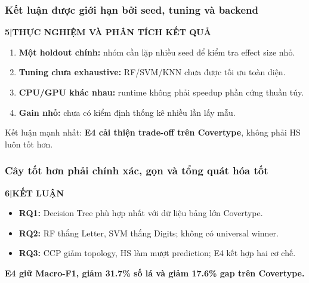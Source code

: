 \documentclass[aspectratio=169,12pt]{beamer}
\newcommand{\chaptertag}[2]{%
  \vspace{-0.16cm}%
  {\scriptsize\bfseries\textcolor{boxframe}{#1\enspace |\enspace #2}}\par
  \vspace{0.12cm}%
}
\begin{document}
\begin{frame}
  \frametitle{Kết luận được giới hạn bởi seed, tuning và backend}
  \chaptertag{5}{THỰC NGHIỆM VÀ PHÂN TÍCH KẾT QUẢ}
  \begin{enumerate}
    \item \textbf{Một holdout chính:} nhóm cần lặp nhiều seed để kiểm tra effect size nhỏ.
    \item \textbf{Tuning chưa exhaustive:} RF/SVM/KNN chưa được tối ưu toàn diện.
    \item \textbf{CPU/GPU khác nhau:} runtime không phải speedup phần cứng thuần túy.
    \item \textbf{Gain nhỏ:} chưa có kiểm định thống kê nhiều lần lấy mẫu.
  \end{enumerate}
  \vspace{0.28cm}
  \begin{tcolorbox}[focusbox,width=0.91\textwidth,top=2mm,bottom=2mm]
    \centering
    Kết luận mạnh nhất: \textbf{E4 cải thiện trade-off trên Covertype}, không phải HS luôn tốt hơn.
  \end{tcolorbox}
\end{frame}

\begin{frame}
  \frametitle{Cây tốt hơn phải chính xác, gọn và tổng quát hóa tốt}
  \chaptertag{6}{KẾT LUẬN}
  \begin{itemize}
    \item \textbf{RQ1:} Decision Tree phù hợp nhất với dữ liệu bảng lớn Covertype.
    \item \textbf{RQ2:} RF thắng Letter, SVM thắng Digits; không có universal winner.
    \item \textbf{RQ3:} CCP giảm topology, HS làm mượt prediction; E4 kết hợp hai cơ chế.
  \end{itemize}
  \vspace{0.35cm}
  \begin{tcolorbox}[focusbox,width=0.92\textwidth,top=3mm,bottom=3mm]
    \centering\large\bfseries
    E4 giữ Macro-F1, giảm 31.7\% số lá và giảm 17.6\% gap trên Covertype.
  \end{tcolorbox}
\end{frame}
\end{document}
